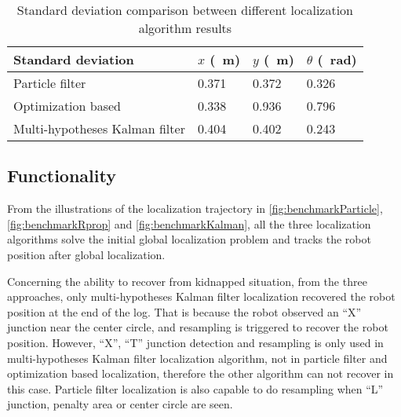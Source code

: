 \begin{table}[h!]
  \centering
  \caption{Standard deviation comparison between different localization algorithm results}
  \label{tab:statistics_std}
  \begin{adjustbox}{max width=\textwidth}
    \begin{tabular}{l|l|l|l}
      Standard deviation                 &   $x$ (\SI{}{\meter})                   &   $y$ (\SI{}{\meter})      & $\theta$  (\SI{}{\radian})         \\\hline
      Particle filter                & 0.371  & 0.372  & 0.326 \\ \hline
      Optimization based             & 0.338 & 0.936 & 0.796  \\ \hline
      Multi-hypotheses Kalman filter  & 0.404 & 0.402  & 0.243  
    \end{tabular}
  \end{adjustbox}
\end{table}

\subsection{Functionality}
\label{sub:Functionality}

From the illustrations of the localization trajectory in \autoref{fig:benchmarkParticle}, \ref{fig:benchmarkRprop} and \ref{fig:benchmarkKalman}, all the three localization algorithms solve the initial global localization problem and tracks the robot position after global localization. 

Concerning the ability to recover from kidnapped situation, from the three approaches, only multi-hypotheses Kalman filter localization recovered the robot position at the end of the log. That is because the robot observed an ``X'' junction near the center circle, and resampling is triggered to recover the robot position. However, ``X'', ``T'' junction detection and resampling is only used in multi-hypotheses Kalman filter localization algorithm, not in particle filter and optimization based localization, therefore the other algorithm can not recover in this case. Particle filter localization is also capable to do resampling when ``L'' junction, penalty area or center circle are seen.

